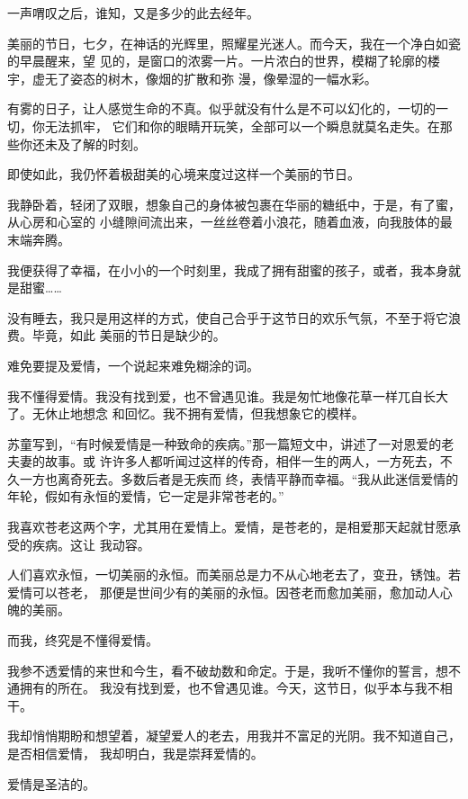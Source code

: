 	\endwriting



		一声喟叹之后，谁知，又是多少的此去经年。


		美丽的节日，七夕，在神话的光辉里，照耀星光迷人。而今天，我在一个净白如瓷的早晨醒来，望
	见的，是窗口的浓雾一片。一片浓白的世界，模糊了轮廓的楼宇，虚无了姿态的树木，像烟的扩散和弥
	漫，像晕湿的一幅水彩。

		有雾的日子，让人感觉生命的不真。似乎就没有什么是不可以幻化的，一切的一切，你无法抓牢，
	它们和你的眼睛开玩笑，全部可以一个瞬息就莫名走失。在那些你还未及了解的时刻。


		即使如此，我仍怀着极甜美的心境来度过这样一个美丽的节日。


		我静卧着，轻闭了双眼，想象自己的身体被包裹在华丽的糖纸中，于是，有了蜜，从心房和心室的
	小缝隙间流出来，一丝丝卷着小浪花，随着血液，向我肢体的最末端奔腾。

		我便获得了幸福，在小小的一个时刻里，我成了拥有甜蜜的孩子，或者，我本身就是甜蜜……


		没有睡去，我只是用这样的方式，使自己合乎于这节日的欢乐气氛，不至于将它浪费。毕竟，如此
	美丽的节日是缺少的。


		难免要提及爱情，一个说起来难免糊涂的词。


		我不懂得爱情。我没有找到爱，也不曾遇见谁。我是匆忙地像花草一样兀自长大了。无休止地想念
	和回忆。我不拥有爱情，但我想象它的模样。


		苏童写到，“有时候爱情是一种致命的疾病。”那一篇短文中，讲述了一对恩爱的老夫妻的故事。或
	许许多人都听闻过这样的传奇，相伴一生的两人，一方死去，不久一方也离奇死去。多数后者是无疾而
	终，表情平静而幸福。“我从此迷信爱情的年轮，假如有永恒的爱情，它一定是非常苍老的。”

		我喜欢苍老这两个字，尤其用在爱情上。爱情，是苍老的，是相爱那天起就甘愿承受的疾病。这让
	我动容。

		人们喜欢永恒，一切美丽的永恒。而美丽总是力不从心地老去了，变丑，锈蚀。若爱情可以苍老，
	那便是世间少有的美丽的永恒。因苍老而愈加美丽，愈加动人心魄的美丽。

		而我，终究是不懂得爱情。


		我参不透爱情的来世和今生，看不破劫数和命定。于是，我听不懂你的誓言，想不通拥有的所在。
	我没有找到爱，也不曾遇见谁。今天，这节日，似乎本与我不相干。


		我却悄悄期盼和想望着，凝望爱人的老去，用我并不富足的光阴。我不知道自己，是否相信爱情，
	我却明白，我是崇拜爱情的。

		爱情是圣洁的。

